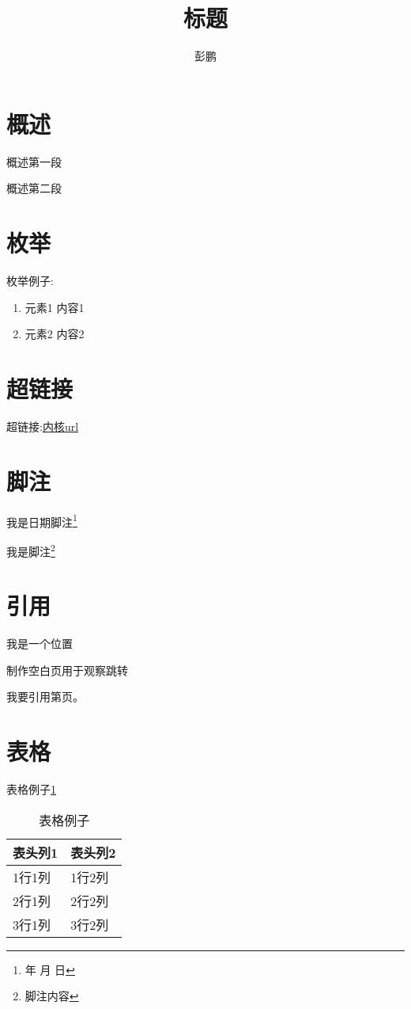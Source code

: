 \documentclass[12pt,a4paper]{article}
\title{标题}
\author{彭鹏}
\renewcommand{\today}{\number\year 年 \number\month 月 \number\day 日}
\begin{document}
\maketitle
\tableofcontents
\newpage

\section{概述}
概述第一段

概述第二段
\section{枚举} 
枚举例子:

\begin{enumerate}
    \item 元素1
        内容1
    \item 元素2
        内容2
\end{enumerate}

\section{超链接} 
超链接:\href{http://ftp.kernel.org/pub/linux/kernel/v3.x/}{内核url}

\section{脚注} 
我是日期脚注\footnote{\today}

我是脚注\footnote{脚注内容}

\section{引用} 
我是一个位置\label{标签1}

制作空白页用于观察跳转
\newpage

我要引用第\pageref{标签1}页。

\section{表格} 
表格例子\ref{表格例子}
\begin{table}[!hbp]
\begin{center}
    \begin{tabular}{|l|l|}
        \hline
        表头列1 & 表头列2 \\
        \hline
        1行1列 & 1行2列 \\
        \hline
        2行1列 & 2行2列 \\
        \hline
        3行1列 & 3行2列 \\
        \hline
    \end{tabular}
    \caption{表格例子\label{表格例子}}
\end{center}
\end{table}
\end{document}
